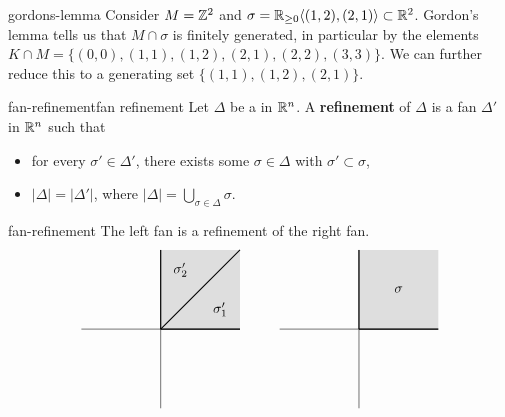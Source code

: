 \begin{example}{gordons-lemma}
    Consider $M = \mathbb{Z}^2$ and $\sigma = \mathbb{R}_{\ge 0} \langle (1, 2), (2, 1) \rangle \subset \mathbb{R}^2$. Gordon's lemma tells us that $M \cap \sigma$ is finitely generated, in particular by the elements $K \cap M = \{ (0, 0), (1, 1), (1, 2), (2, 1), (2, 2), (3, 3) \}$. We can further reduce this to a generating set $\{ (1, 1), (1, 2), (2, 1) \}$.
\end{example}

\begin{topic}{fan-refinement}{fan refinement}
    Let $\Delta$ be a  in $\mathbb{R}^n$. A \textbf{refinement} of $\Delta$ is a fan $\Delta'$ in $\mathbb{R}^n$ such that
    \begin{itemize}
        \item for every $\sigma' \in \Delta'$, there exists some $\sigma \in \Delta$ with $\sigma' \subset \sigma$,
        \item $|\Delta| = |\Delta'|$, where $|\Delta| = \bigcup_{\sigma \in \Delta} \sigma$.
    \end{itemize}
\end{topic}

\begin{example}{fan-refinement}
    The left fan is a refinement of the right fan.
    \[ \begin{tikzpicture}
        \begin{scope}[shift={(-5,0)}]
            \draw (-2, 0) -- (2, 0);
            \draw (0, -2) -- (0, 2);
            \fill[fill=gray!50, opacity=0.5] (0, 0) -- (0, 2) -- (2, 2) -- (2, 0);
            \draw[thick] (0, 0) -- (2, 0);
            \draw[thick] (0, 0) -- (0, 2);
            \draw[thick] (0, 0) -- (2, 2);
            \node at (1.5, 0.5) {$\sigma'_1$};
            \node at (0.5, 1.5) {$\sigma'_2$};
        \end{scope}
        \begin{scope}
            \draw (-2, 0) -- (2, 0);
            \draw (0, -2) -- (0, 2);
            \fill[fill=gray!50, opacity=0.5] (0, 0) -- (0, 2) -- (2, 2) -- (2, 0);
            \draw[thick] (0, 0) -- (2, 0);
            \draw[thick] (0, 0) -- (0, 2);
            \node at (1, 1) {$\sigma$};
        \end{scope}
    \end{tikzpicture} \]
\end{example}

